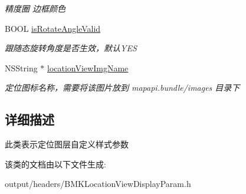 \begin{DoxyCompactItemize}
\begin{DoxyCompactList}\small\item\em 精度圈 边框颜色 \end{DoxyCompactList}\item 
\hypertarget{interface_b_m_k_location_view_display_param_aa54fa5d0bffbc1a5b07ed837f632e679}{}B\+O\+O\+L \hyperlink{interface_b_m_k_location_view_display_param_aa54fa5d0bffbc1a5b07ed837f632e679}{is\+Rotate\+Angle\+Valid}\label{interface_b_m_k_location_view_display_param_aa54fa5d0bffbc1a5b07ed837f632e679}

\begin{DoxyCompactList}\small\item\em 跟随态旋转角度是否生效，默认\+Y\+E\+S \end{DoxyCompactList}\item 
\hypertarget{interface_b_m_k_location_view_display_param_af122b975fe0c3d636b94226382475366}{}N\+S\+String $\ast$ \hyperlink{interface_b_m_k_location_view_display_param_af122b975fe0c3d636b94226382475366}{location\+View\+Img\+Name}\label{interface_b_m_k_location_view_display_param_af122b975fe0c3d636b94226382475366}

\begin{DoxyCompactList}\small\item\em 定位图标名称，需要将该图片放到 mapapi.\+bundle/images 目录下 \end{DoxyCompactList}\end{DoxyCompactItemize}


\subsection{详细描述}
此类表示定位图层自定义样式参数 

该类的文档由以下文件生成\+:\begin{DoxyCompactItemize}
\item 
output/headers/B\+M\+K\+Location\+View\+Display\+Param.\+h\end{DoxyCompactItemize}

